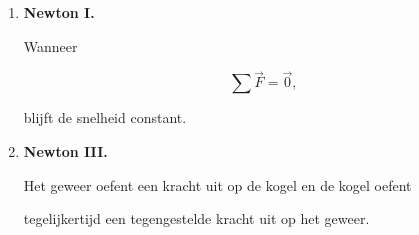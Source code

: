 \documentclass{ximera}
\begin{document}
\begin{oefening}{\oefB\ESS}
\begin{oplossing}
\begin{enumerate}
  tegelijkertijd een tegengestelde kracht uit op de zwemmer.

  \item \textbf{Newton I.}

  Wanneer

  \[\sum\vec F=\vec0,\]

  blijft de snelheid constant.

  \item \textbf{Newton III.}

  Het geweer oefent een kracht uit op de kogel en de kogel oefent

  tegelijkertijd een tegengestelde kracht uit op het geweer.

\end{enumerate}

\end{oplossing}

\end{oefening}
\end{document}
